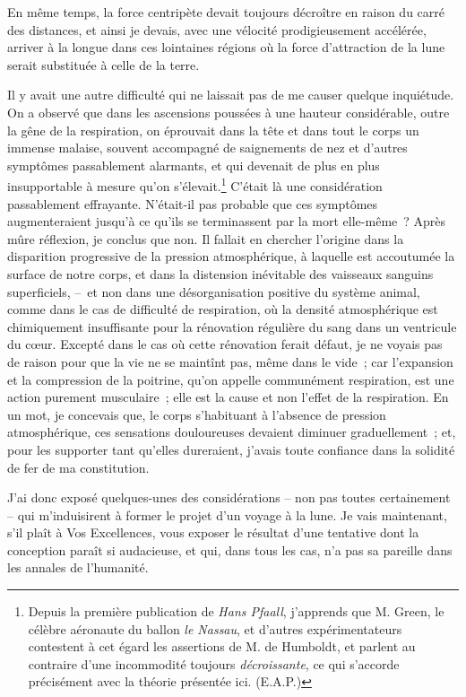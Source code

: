 \documentclass[french,twoside]{book} %
\begin{document}
En même temps, la force centripète devait toujours décroître en raison du carré des distances, et ainsi je devais, avec une vélocité prodigieusement accélérée, arriver à la longue dans ces lointaines régions où la force d’attraction de la lune serait substituée à celle de la terre.\par
Il y avait une autre difficulté qui ne laissait pas de me causer quelque inquiétude. On a observé que dans les ascensions poussées à une hauteur considérable, outre la gêne de la respiration, on éprouvait dans la tête et dans tout le corps un immense malaise, souvent accompagné de saignements de nez et d’autres symptômes passablement alarmants, et qui devenait de plus en plus insupportable à mesure qu’on s’élevait.\footnote{Depuis la première publication de \emph{Hans Pfaall}, j’apprends que M. Green, le célèbre aéronaute du ballon \emph{le Nassau}, et d’autres expérimentateurs contestent à cet égard les assertions de M. de Humboldt, et parlent au contraire d’une incommodité toujours \emph{décroissante}, ce qui s’accorde précisément avec la théorie présentée ici. (E.A.P.)} C’était là une considération passablement effrayante. N’était-il pas probable que ces symptômes augmenteraient jusqu’à ce qu’ils se terminassent par la mort elle-même ? Après mûre réflexion, je conclus que non. Il fallait en chercher l’origine dans la disparition progressive de la pression atmosphérique, à laquelle est accoutumée la surface de notre corps, et dans la distension inévitable des vaisseaux sanguins superficiels, – et non dans une désorganisation positive du système animal, comme dans le cas de difficulté de respiration, où la densité atmosphérique est chimiquement insuffisante pour la rénovation régulière du sang dans un ventricule du cœur. Excepté dans le cas où cette rénovation ferait défaut, je ne voyais pas de raison pour que la vie ne se maintînt pas, même dans le vide ; car l’expansion et la compression de la poitrine, qu’on appelle communément respiration, est une action purement musculaire ; elle est la cause et non l’effet de la respiration. En un mot, je concevais que, le corps s’habituant à l’absence de pression atmosphérique, ces sensations douloureuses devaient diminuer graduellement ; et, pour les supporter tant qu’elles dureraient, j’avais toute confiance dans la solidité de fer de ma constitution.\par
J’ai donc exposé quelques-unes des considérations – non pas toutes certainement – qui m’induisirent à former le projet d’un voyage à la lune. Je vais maintenant, s’il plaît à Vos Excellences, vous exposer le résultat d’une tentative dont la conception paraît si audacieuse, et qui, dans tous les cas, n’a pas sa pareille dans les annales de l’humanité.\par
\end{document}
